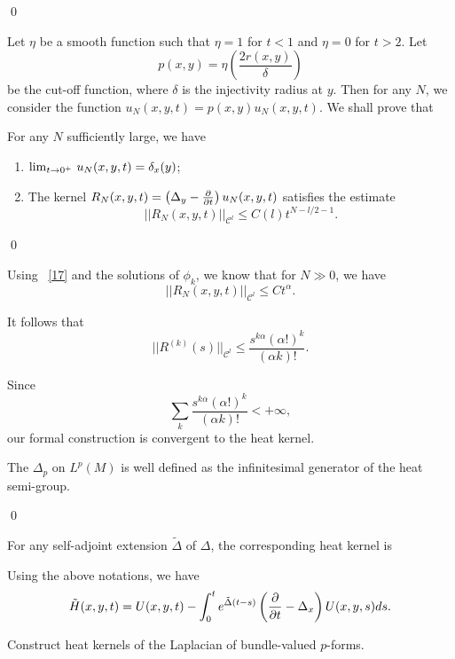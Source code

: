 \qed

 
 Let $\eta$ be a smooth function such that $\eta=1$ for $t<1$ and $\eta=0$ for $t>2$. Let
 \[
 p(x,y)=\eta\left(\frac{2r(x,y)}{\delta}\right)
 \]
 be the cut-off function, where $\delta$ is the injectivity  radius at $y$. Then for any $N$, we consider the function $u_N(x,y,t)=p(x,y)u_N(x,y,t)$. We shall prove that 
 
 \begin{lemma}
 For any $N$ sufficiently large, we have
 \begin{enumerate}
 \item $\lim_{t\to 0^+}\, u_N(x,y,t)=\delta_x(y)$;
 \item The kernel $R_N(x,y,t)=\left(\Delta_y-\frac{\partial}{\partial t}\right)u_N(x,y,t)$ satisfies the estimate
 \[
 ||R_N(x,y,t)||_{\mathcal  C^l}\leq C(l)t^{N-l/2-1}.
 \]
 \end{enumerate}
 \end{lemma}
 
 \qed
 
 Using ~\eqref{17} and the solutions of $\phi_k$, we know that for $N\gg 0$, we have
 \[
  ||R_N(x,y,t)||_{\mathcal  C^l}\leq Ct^\alpha.
  \]
  
  It follows that
  \[
  ||R^{(k)}(s)||_{\mathcal  C^l}\leq\frac{s^{k\alpha}(\alpha!)^k}{(\alpha k)!}.
  \]
  
  Since
  \[
  \sum_k\frac{s^{k\alpha}(\alpha!)^k}{(\alpha k)!}<+\infty,
  \]
 our formal construction is convergent to the heat kernel.
 
 \begin{theorem} The $\Delta_p$ on $L^p(M)$ is well defined as the infinitesimal generator of the heat semi-group.
 \end{theorem}
 
 \qed
 
For any self-adjoint extension $\tilde\Delta$ of $\Delta$, the corresponding heat kernel is
 \begin{theorem}
 Using the above notations, we have
 \[
\tilde  H(x,y,t)=U(x,y,t)-\int_0^te^{\tilde \Delta(t-s)}\left(\frac{\partial}{\partial t}-\Delta_x\right) U(x,y,s) ds.
 \]
 \end{theorem}
 
 
\begin{ex} Construct heat kernels of the Laplacian of  bundle-valued $p$-forms. \end{ex}
 


